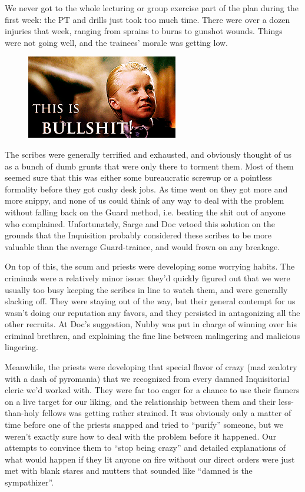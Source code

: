 We never got to the whole lecturing or group exercise part of the plan during the first week: 
the PT and drills just took too much time. 
There were over a dozen injuries that week, ranging from sprains to burns to gunshot wounds. 
Things were not going well, and the trainees’ morale was getting low.

\begin{figure}
	\begin{center}
		\includegraphics[width=\figwidth]{pics/8/13.png}
	\end{center}
\end{figure}
The scribes were generally terrified and exhausted, and obviously thought of us as a bunch of dumb grunts that were only there to torment them. 
Most of them seemed sure that this was either some bureaucratic screwup or a pointless formality before they got cushy desk jobs. 
As time went on they got more and more snippy, and none of us could think of any way to deal with the problem without falling back on the Guard method, i.e. 
beating the shit out of anyone who complained. 
Unfortunately, Sarge and Doc vetoed this solution on the grounds that the Inquisition probably considered these scribes to be more valuable than the average Guard-trainee, and would frown on any breakage.

On top of this, the scum and priests were developing some worrying habits. 
The criminals were a relatively minor issue: 
they’d quickly figured out that we were usually too busy keeping the scribes in line to watch them, and were generally slacking off. 
They were staying out of the way, but their general contempt for us wasn’t doing our reputation any favors, and they persisted in antagonizing all the other recruits. 
At Doc’s suggestion, Nubby was put in charge of winning over his criminal brethren, and explaining the fine line between malingering and malicious lingering.

Meanwhile, the priests were developing that special flavor of crazy (mad zealotry with a dash of pyromania) that we recognized from every damned Inquisitorial cleric we’d worked with. 
They were far too eager for a chance to use their flamers on a live target for our liking, and the relationship between them and their less-than-holy fellows was getting rather strained. 
It was obviously only a matter of time before one of the priests snapped and tried to “purify” someone, but we weren’t exactly sure how to deal with the problem before it happened. 
Our attempts to convince them to “stop being crazy” and detailed explanations of what would happen if they lit anyone on fire without our direct orders were just met with blank stares and mutters that sounded like “damned is the sympathizer”.

